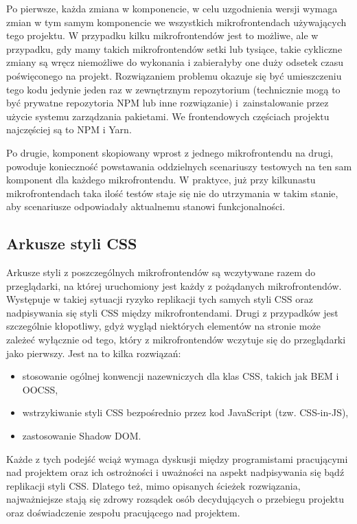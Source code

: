 \documentclass{SGGW-thesis}
\begin{document}
Po pierwsze, każda zmiana w komponencie, w celu uzgodnienia wersji wymaga zmian w tym samym komponencie we wszystkich mikrofrontendach używających tego projektu. W przypadku kilku mikrofrontendów jest to możliwe, ale w przypadku, gdy mamy takich mikrofrontendów setki lub tysiące, takie cykliczne zmiany są wręcz niemożliwe do wykonania i zabierałyby one duży odsetek czasu poświęconego na projekt.
Rozwiązaniem problemu okazuje się być umieszczeniu tego kodu jedynie jeden raz w zewnętrznym repozytorium (technicznie mogą to być prywatne repozytoria NPM lub inne rozwiązanie) i~zainstalowanie przez użycie systemu zarządzania pakietami. We frontendowych częściach projektu najczęściej są to NPM i Yarn.

Po drugie, komponent skopiowany wprost z jednego mikrofrontendu na drugi, powoduje konieczność powstawania oddzielnych scenariuszy testowych na ten sam komponent dla każdego mikrofrontendu. W praktyce, już przy kilkunastu mikrofrontendach taka ilość testów staje się nie do utrzymania w takim stanie, aby scenariusze odpowiadały aktualnemu stanowi funkcjonalności.

\subsection{Arkusze styli CSS}
Arkusze styli z poszczególnych mikrofrontendów są wczytywane razem do przeglądarki, na której uruchomiony jest każdy z pożądanych mikrofrontendów. Występuje w takiej sytuacji ryzyko replikacji tych samych styli CSS oraz nadpisywania się styli CSS między mikrofrontendami. Drugi z przypadków jest szczególnie kłopotliwy, gdyż wygląd niektórych elementów na stronie może zależeć wyłącznie od tego, który z mikrofrontendów wczytuje się do przeglądarki jako pierwszy. Jest na to kilka rozwiązań:

\begin{itemize}
	\item stosowanie ogólnej konwencji nazewniczych dla klas CSS, takich jak BEM i OOCSS,
	\item wstrzykiwanie styli CSS bezpośrednio przez kod JavaScript (tzw. CSS-in-JS),
	\item zastosowanie Shadow DOM.
\end{itemize}

Każde z tych podejść wciąż wymaga dyskusji między programistami pracującymi nad projektem oraz ich ostrożności i uważności na aspekt nadpisywania się bądź replikacji styli CSS. Dlatego też, mimo opisanych ścieżek rozwiązania, najważniejsze stają się zdrowy rozsądek osób decydujących o przebiegu projektu oraz doświadczenie zespołu pracującego nad projektem.
\end{document}
